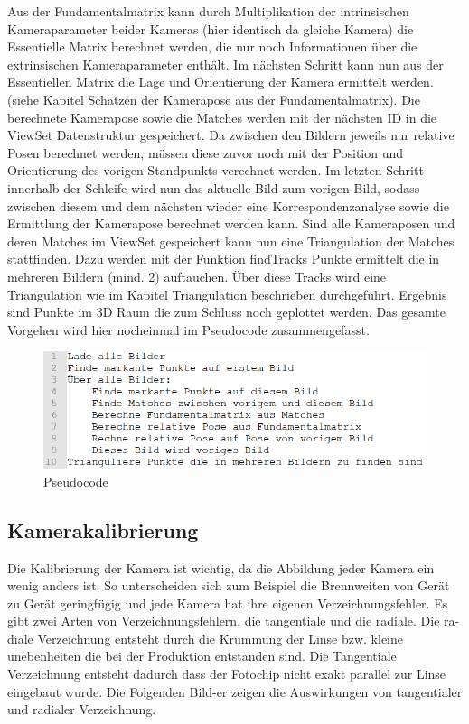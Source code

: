 Aus der Fundamentalmatrix kann durch Multiplikation der intrinsischen Kameraparameter beider Kameras (hier identisch da gleiche Kamera) die Essentielle Matrix berechnet werden, die nur noch Informationen über die extrinsischen Kameraparameter enthält. Im nächsten Schritt kann nun aus der Essentiellen Matrix die Lage und Orientierung der Kamera ermittelt werden. (siehe Kapitel Schätzen der Kamerapose aus der Fundamentalmatrix).
Die berechnete Kamerapose sowie die Matches werden mit der nächsten ID in die ViewSet  Datenstruktur gespeichert. Da zwischen den Bildern jeweils nur relative Posen berechnet werden, müssen diese zuvor noch mit der Position und Orientierung des vorigen Standpunkts verechnet werden. 
Im letzten Schritt innerhalb der Schleife wird nun das aktuelle Bild zum vorigen Bild, sodass zwischen diesem und dem nächsten wieder eine Korrespondenzanalyse sowie die Ermittlung der Kamerapose berechnet werden kann.
Sind alle Kameraposen und deren Matches im ViewSet gespeichert kann nun eine Triangulation der Matches stattfinden. Dazu werden mit der Funktion findTracks Punkte ermittelt die in mehreren Bildern (mind. 2) auftauchen. Über diese Tracks wird eine Triangulation wie im Kapitel Triangulation beschrieben durchgeführt. Ergebnis sind Punkte im 3D Raum die zum Schluss noch geplottet werden.
Das gesamte Vorgehen wird hier nocheinmal im Pseudocode zusammengefasst.
\begin{figure}[ht]
    \centering
    \includegraphics[scale=0.75]{Figures/Pseudocode.PNG}
    \caption{Pseudocode}
\end{figure}

\subsection{Kamerakalibrierung}
Die Kalibrierung der Kamera ist wichtig, da die Abbildung jeder Kamera ein wenig anders ist. So unterscheiden sich zum Beispiel die Brennweiten von Gerät zu Gerät geringfügig und jede Kamera hat ihre eigenen Verzeichnungsfehler.
Es gibt zwei Arten von Verzeichnungsfehlern, die tangentiale und die radiale. Die ra-diale Verzeichnung entsteht durch die Krümmung der Linse bzw. kleine unebenheiten die bei der Produktion entstanden sind. Die Tangentiale Verzeichnung entsteht dadurch dass der Fotochip nicht exakt parallel zur Linse eingebaut wurde. Die Folgenden Bild-er zeigen die Auswirkungen von tangentialer und radialer Verzeichnung.

